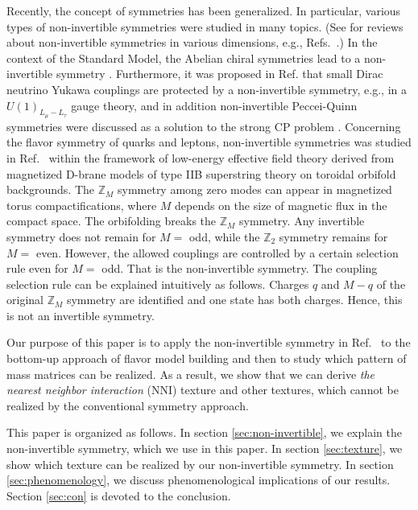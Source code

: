 \documentclass[a4paper,11pt]{article}
\numberwithin{equation}{section}
\begin{document}
Recently, the concept of symmetries has been generalized.
In particular, various types of non-invertible symmetries were studied in many topics. (See for reviews about non-invertible symmetries in various dimensions, e.g., Refs.~\cite{Gomes:2023ahz,Schafer-Nameki:2023jdn,Bhardwaj:2023kri,Shao:2023gho}.) 
In the context of the Standard Model, the Abelian chiral symmetries lead to a non-invertible symmetry \cite{Choi:2022jqy,Cordova:2022ieu}. 
Furthermore, it was proposed in Ref. \cite{Cordova:2022fhg} that small Dirac neutrino Yukawa couplings are protected by a non-invertible symmetry, e.g., in a $U(1)_{L_\mu - L_\tau}$ gauge theory, and in addition non-invertible Peccei-Quinn symmetries were discussed as a solution to the strong CP problem \cite{Cordova:2024ypu}. 
Concerning the flavor symmetry of quarks and leptons, non-invertible symmetries was studied in Ref.~\cite{Kobayashi:2024yqq} within the framework of low-energy effective field theory derived from magnetized D-brane models of 
type IIB superstring theory on toroidal orbifold backgrounds. 
The $\mathbb{Z}_M$ symmetry among zero modes can appear in magnetized torus compactifications, where 
$M$ depends on the size of magnetic flux in the compact space. 
The orbifolding breaks the $\mathbb{Z}_M$ symmetry.
Any invertible symmetry does not remain for $M=$ odd, while the $\mathbb{Z}_2$ symmetry remains for $M=$ even. 
However, the allowed couplings are controlled by a certain selection rule even for $M=$ odd. 
That is the non-invertible symmetry. The coupling selection rule can be explained intuitively as follows. 
Charges $q$ and $M-q$ of the original $\mathbb{Z}_M$ symmetry are identified and one state has both charges. 
Hence, this is not an invertible symmetry.


Our purpose of this paper is to apply the non-invertible symmetry in Ref.~\cite{Kobayashi:2024yqq} 
to the bottom-up approach of flavor model building and then to study which pattern of mass matrices can be realized. 
As a result, we show that we can derive 
{\it the nearest neighbor interaction} (NNI) texture \cite{Branco:1988iq,Branco:1994jx,Branco:1999nb} and other textures, which cannot be realized by the conventional symmetry approach. 


This paper is organized as follows.
In section \ref{sec:non-invertible}, we explain the non-invertible symmetry, which we use in this paper.
In section \ref{sec:texture}, we show which texture can be realized by our non-invertible symmetry.
In section \ref{sec:phenomenology}, we discuss phenomenological implications of our results.
Section \ref{sec:con} is devoted to the conclusion.
\end{document}
